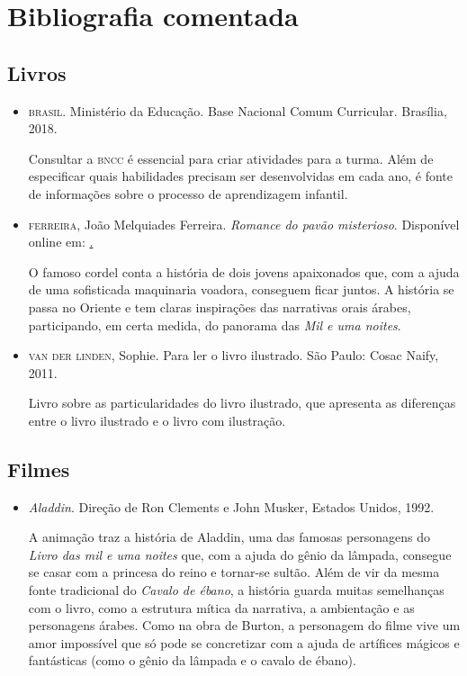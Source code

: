 \documentclass[11pt]{extarticle}
\begin{document}
\section{Bibliografia comentada}

\subsection{Livros}

\begin{itemize}
\item \textsc{brasil}. Ministério da Educação. Base Nacional Comum Curricular. Brasília, 2018.

Consultar a \textsc{bncc} é essencial para criar atividades para a turma. Além de especificar 
quais habilidades precisam ser desenvolvidas em cada ano, é fonte de informações sobre 
o processo de aprendizagem infantil. 

\item \textsc{ferreira}, João Melquiades Ferreira. \textit{Romance do pavão misterioso}. Disponível online em: \href{http://www.dominiopublico.gov.br/download/texto/jn000008.pdf}.

O famoso cordel conta a história de dois jovens apaixonados que, com a ajuda de uma sofisticada maquinaria voadora, conseguem ficar juntos. A história se passa no Oriente e tem claras inspirações das narrativas orais árabes, participando, em certa medida, do panorama das \textit{Mil e uma noites}.


\item \textsc{van der linden}, Sophie. Para ler o livro ilustrado. São Paulo: Cosac Naify, 2011.

Livro sobre as particularidades do livro ilustrado, que apresenta as diferenças entre o livro ilustrado e o livro com ilustração. 
\end{itemize}

\subsection{Filmes}

\begin{itemize}
\item \textit{Aladdin}. Direção de Ron Clements e John Musker, Estados Unidos, 1992.

A animação traz a história de Aladdin, uma das famosas personagens do \textit{Livro das mil e uma noites} que, com a ajuda do gênio da lâmpada, consegue se casar com a princesa do reino e tornar-se sultão. Além de vir da mesma fonte tradicional do \textit{Cavalo de ébano}, a história guarda muitas semelhanças com o livro, como a estrutura mítica da narrativa, a ambientação e as personagens árabes. Como na obra de Burton, a personagem do filme vive um amor impossível que só pode se concretizar com a ajuda de artífices mágicos e fantásticas (como o gênio da lâmpada e o cavalo de ébano). 
\end{itemize}
\end{document}

